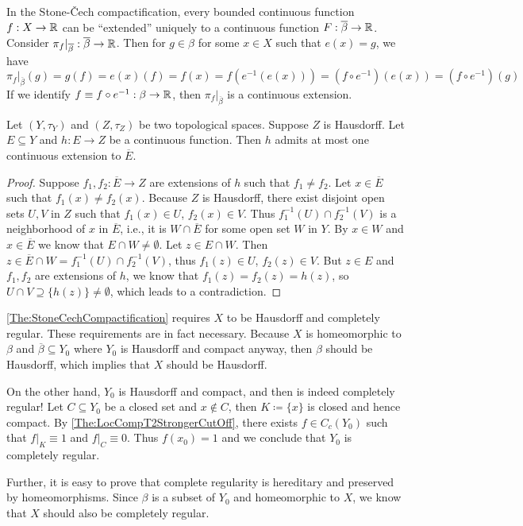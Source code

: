 \documentclass[screen]{techreport}
\numberwithin{equation}{section}
\begin{document}
\begin{remark}
	In the Stone-{\v{C}}ech compactification, every bounded continuous function $f:X \to \mathbb{R}$ can be ``extended'' uniquely to a continuous function $F : \overline{\beta} \to \mathbb{R}$.
	Consider $\pi_f |_{\overline{\beta}} : \overline{\beta} \to \mathbb{R}$.
	Then for $g \in \beta$ for some $x \in X$ such that $e(x) = g$, we have
	\[
	\pi_f|_{\overline{\beta}}(g) = g(f) = e(x)(f) = f(x) = f(e^{-1}(e(x))) = (f \circ e^{-1})(e(x)) = (f \circ e^{-1})(g)
	\]
	If we identify $f \equiv f \circ e^{-1} : \beta \to \mathbb{R}$, then $\pi_f|_{\overline{\beta}}$ is a continuous extension.
\end{remark}

\begin{proposition}\label{Prop:ContIntoT2AtMostOneExt}
	Let $(Y,\tau_Y)$ and $(Z,\tau_Z)$ be two topological spaces.
	Suppose $Z$ is Hausdorff.
	Let $E \subseteq Y$ and $h : E \to Z$ be a continuous function.
	Then $h$ admits at most one continuous extension to $\overline{E}$.
\end{proposition}
\begin{proof}
	Suppose $f_1,f_2 : \overline{E} \to Z$ are extensions of $h$ such that $f_1 \neq f_2$.
	Let $x \in \overline{E}$ such that $f_1(x) \neq f_2(x)$.
	Because $Z$ is Hausdorff, there exist disjoint open sets $U,V$ in $Z$ such that $f_1(x) \in U$, $f_2(x) \in V$.
	Thus $f_1^{-1}(U) \cap f_2^{-1}(V)$ is a neighborhood of $x$ in $\overline{E}$, i.e., it is $W \cap \overline{E}$ for some open set $W$ in $Y$.
	By $x \in W$ and $x \in \overline{E}$ we know that $E \cap W \neq \emptyset$.
	Let $z \in E \cap W$.
	Then $z \in \overline{E} \cap W = f_1^{-1}(U) \cap f_2^{-1}(V)$, thus $f_1(z) \in U$, $f_2(z) \in V$.
	But $z \in E$ and $f_1,f_2$ are extensions of $h$, we know that $f_1(z) = f_2(z)=h(z)$, so $U \cap V \supseteq \{ h(z) \} \neq \emptyset$, which leads to a contradiction.
\end{proof}

\begin{remark}\label{Rem:StoneCechNecessary}
	\cref{The:StoneCechCompactification} requires $X$ to be Hausdorff and completely regular.
	These requirements are in fact necessary.
	Because $X$ is homeomorphic to $\beta$ and $\overline{\beta} \subseteq Y_0$ where $Y_0$ is Hausdorff and compact anyway, then $\beta$ should be Hausdorff, which implies that $X$ should be Hausdorff.
	
	On the other hand, $Y_0$ is Hausdorff and compact, and then is indeed completely regular!
	Let $C \subseteq Y_0$ be a closed set and $x \not\in C$, then $K \coloneqq \{ x \}$ is closed and hence compact.
	By \cref{The:LocCompT2StrongerCutOff}, there exists $f \in C_c(Y_0)$ such that $f|_K \equiv 1$ and $f|_{C} \equiv 0$.
	Thus $f(x_0) = 1$ and we conclude that $Y_0$ is completely regular.
	
	Further, it is easy to prove that complete regularity is hereditary and preserved by homeomorphisms.
	Since $\beta$ is a subset of $Y_0$ and homeomorphic to $X$, we know that $X$ should also be completely regular.
\end{remark}
\end{document}
